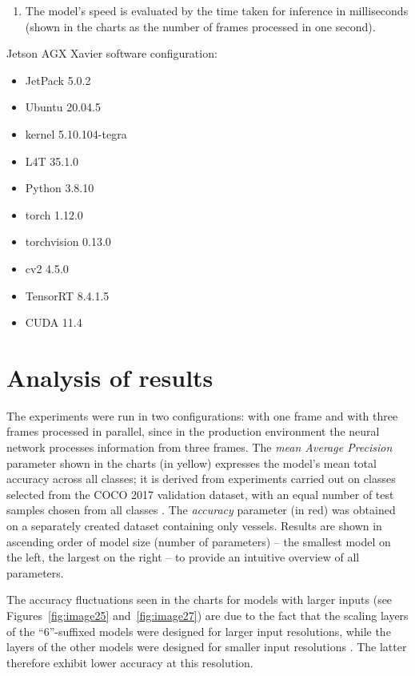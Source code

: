 \begin{enumerate}
\def\labelenumi{\arabic{enumi}.}
\setcounter{enumi}{4}
\tightlist
\item
  The model's speed is evaluated by the time taken for inference in milliseconds (shown in the charts as the number of frames processed in one second).
\end{enumerate}

Jetson AGX Xavier software configuration:

\begin{itemize}
\item
  JetPack 5.0.2
\item
  Ubuntu 20.04.5
\item
  kernel 5.10.104-tegra
\item
  L4T 35.1.0
\item
  Python 3.8.10
\item
  torch 1.12.0
\item
  torchvision 0.13.0
\item
  cv2 4.5.0
\item
  TensorRT 8.4.1.5
\item
  CUDA 11.4
\end{itemize}

\section{Analysis of results}\label{analysis-of-results}

The experiments were run in two configurations: with one frame and with three frames processed in parallel, since in the production environment the neural network processes information from three frames. The \emph{mean Average Precision} parameter shown in the charts (in yellow) expresses the model's mean total accuracy across all classes; it is derived from experiments carried out on classes selected from the COCO 2017 validation dataset, with an equal number of test samples chosen from all classes \cite{ref64}. The \emph{accuracy} parameter (in red) was obtained on a separately created dataset containing only vessels. Results are shown in ascending order of model size (number of parameters) -- the smallest model on the left, the largest on the right -- to provide an intuitive overview of all parameters.

The accuracy fluctuations seen in the charts for models with larger inputs (see Figures~\ref{fig:image25} and~\ref{fig:image27}) are due to the fact that the scaling layers of the ``6''-suffixed models were designed for larger input resolutions, while the layers of the other models were designed for smaller input resolutions \cite{ref65}. The latter therefore exhibit lower accuracy at this resolution.

